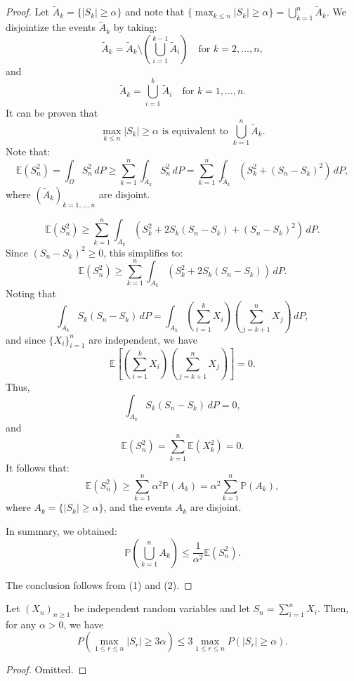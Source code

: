 \begin{proof}
Let $\tilde{A}_k = \{ |S_k| \geq \alpha \}$ and note that $\{ \max_{k \leq n} |S_k| \geq \alpha \} = \bigcup_{k=1}^n \tilde{A}_k$. We disjointize the events $\tilde{A}_k$ by taking:
\[
\tilde{A}_k = \tilde{A}_k \setminus \left( \bigcup_{i=1}^{k-1} \tilde{A}_i \right) \quad \text{for } k=2, \ldots, n,
\]
and
\[
\tilde{A}_k = \bigcup_{i=1}^k \tilde{A}_i \quad \text{for } k=1, \ldots, n.
\]
It can be proven that
\[
\max_{k \leq n} |S_k| \geq \alpha \text{ is equivalent to } \bigcup_{k=1}^n \tilde{A}_k.
\]
Note that:
\[
\mathbb{E}(S_n^2) = \int_{\Omega} S_n^2 \, dP \geq \sum_{k=1}^n \int_{\tilde{A}_k} S_n^2 \, dP = \sum_{k=1}^n \int_{\tilde{A}_k} (S_k^2 + (S_n - S_k)^2) \, dP,
\]
where $(\tilde{A}_k)_{k=1,\ldots,n}$ are disjoint.

\[
\mathbb{E}(S_n^2) \geq \sum_{k=1}^n \int_{A_k} \left( S_k^2 + 2S_k(S_n-S_k) + (S_n-S_k)^2 \right) \, dP.
\]
Since $(S_n-S_k)^2 \geq 0$, this simplifies to:
\[
\mathbb{E}(S_n^2) \geq \sum_{k=1}^n \int_{A_k} \left( S_k^2 + 2S_k(S_n-S_k) \right) \, dP.
\]
Noting that
\[
\int_{A_k} S_k(S_n-S_k) \, dP = \int_{A_k} \left( \sum_{i=1}^k X_i \right) \left( \sum_{j=k+1}^n X_j \right) \, dP,
\]
and since $\{X_i\}_{i=1}^n$ are independent, we have
\[
\mathbb{E} \left[ \left(\sum_{i=1}^k X_i\right) \left(\sum_{j=k+1}^n X_j\right) \right] = 0.
\]
Thus,
\[
\int_{A_k} S_k(S_n-S_k) \, dP = 0,
\]
and
\[
\mathbb{E}(S_n^2) = \sum_{k=1}^n \mathbb{E}(X_k^2) = 0.
\]
It follows that:
\[
\mathbb{E}(S_n^2) \geq \sum_{k=1}^n \alpha^2 \mathbb{P}(A_k) = \alpha^2 \sum_{k=1}^n \mathbb{P}(A_k),
\]
where $A_k = \{ |S_k| \geq \alpha \}$, and the events $A_k$ are disjoint.

In summary, we obtained:
\[
\mathbb{P} \left( \bigcup_{k=1}^n A_k \right) \leq \frac{1}{\alpha^2} \mathbb{E}(S_n^2).
\]

The conclusion follows from (1) and (2).
\end{proof}



\begin{theorem}
Let $(X_n)_{n\geq 1}$ be independent random variables and let $S_n = \sum_{i=1}^n X_i$. Then, for any $\alpha > 0$, we have
\[
P\left( \max_{1 \leq r \leq n} |S_r| \geq 3\alpha \right) \leq 3 \max_{1 \leq r \leq n} P(|S_r| \geq \alpha).
\]
\end{theorem}

\begin{proof}
Omitted.
\end{proof}

